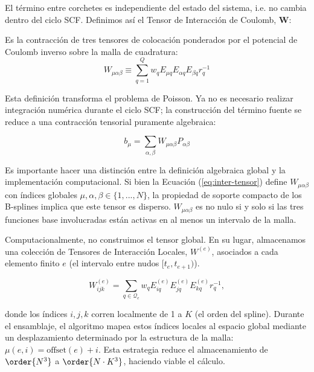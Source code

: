 El término entre corchetes es independiente del estado del sistema, i.e. no cambia dentro del ciclo SCF. Definimos así el Tensor de Interacción de Coulomb, \( \mathbf{W} \):

\begin{definition}
Es la contracción de tres tensores de colocación ponderados por el potencial de Coulomb inverso sobre la malla de cuadratura:
\begin{equation}
  \label{eq:inter-tensor}
W_{\mu \alpha \beta} \equiv \sum_{q=1}^Q w_q E_{\mu q} E_{\alpha q} E_{\beta q} r_q^{-1}
\end{equation}
\end{definition}

Esta definición transforma el problema de Poisson. Ya no es necesario realizar integración numérica durante el ciclo SCF; la construcción del término fuente se reduce a una contracción tensorial puramente algebraica:

\begin{equation}
b_\mu = \sum_{\alpha, \beta} W_{\mu \alpha \beta} P_{\alpha \beta}
\end{equation}

Es importante hacer una distinción entre la definición algebraica global y la implementación computacional. Si bien la Ecuación (\ref{eq:inter-tensor}) define \( W_{\mu\alpha\beta} \) con índices globales \( \mu,\alpha,\beta \in \{1,...,N\} \), la propiedad de soporte compacto de los B-splines implica que este tensor es disperso. \( W_{\mu\alpha\beta} \) es no nulo si y solo si las tres funciones base involucradas están activas en al menos un intervalo de la malla.

Computacionalmente, no construimos el tensor global. En su lugar, almacenamos una colección de Tensores de Interacción Locales, \( W^{(e)} \), asociados a cada elemento finito \( e \) (el intervalo entre nudos \( [t_e, t_{e+1} ) \)).

\begin{equation}
  \label{eq:inter-tensor-local}
  W_{ijk}^{(e)} = \sum_{q\in \mathcal{Q}_e} w_q E_{iq}^{(e)}E_{jq}^{(e)}E_{kq}^{(e)} r_q^{-1},
\end{equation}

donde los índices \( i,j,k \) corren localmente de 1 a \( K \) (el orden del spline). Durante el ensamblaje, el algoritmo mapea estos índices locales al espacio global mediante un desplazamiento determinado por la estructura de la malla: \( \mu(e,i) = \textrm{offset}(e) + i \). Esta estrategia reduce el almacenamiento de \( \order{N^3} \) a \( \order{N\cdot K^3} \), haciendo viable el cálculo.



